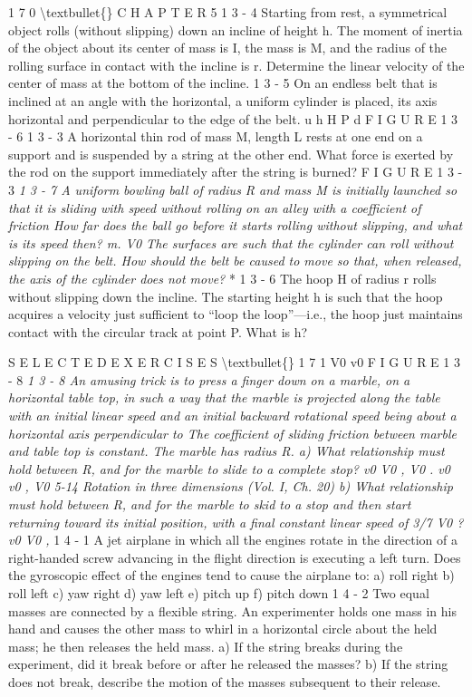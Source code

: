\documentclass[10pt,oneside]{article}
\begin{document}
1 7 0 \textbackslash{}textbullet\{\} C H A P T E R  5 \emph{ } 1 3 - 4 Starting from rest, a symmetrical object rolls (without slipping) down an incline of height h. The moment of inertia of the object about its center of mass is I, the mass is M, and the radius of the rolling surface in contact with the incline is r. Determine the linear velocity of the center of mass at the bottom of the incline. \emph{ } 1 3 - 5 On an endless belt that is inclined at an angle with the horizontal, a uniform cylinder is placed, its axis horizontal and perpendicular to the edge of the belt. u h H P d F I G U R E  1 3 - 6 \emph{ } 1 3 - 3 A horizontal thin rod of mass M, length L rests at one end on a support and is suspended by a string at the other end. What force is exerted by the rod on the support immediately after the string is burned? F I G U R E  1 3 - 3 \emph{ } \emph{ 1 3 - 7 A uniform bowling ball of radius R and mass M is initially launched so that it is sliding with speed without rolling on an alley with a coefficient of friction How far does the ball go before it starts rolling without slipping, and what is its speed then? m. V0 The surfaces are such that the cylinder can roll without slipping on the belt. How should the belt be caused to move so that, when released, the axis of the cylinder does not move? } * 1 3 - 6 The hoop H of radius r rolls without slipping down the incline. The starting height h is such that the hoop acquires a velocity just sufficient to “loop the loop”---i.e., the hoop just maintains contact with the circular track at point P. What is h?\par

S E L E C T E D  E X E R C I S E S \textbackslash{}textbullet\{\} 1 7 1 V0 v0 F I G U R E  1 3 - 8 \emph{ } \emph{ 1 3 - 8 An amusing trick is to press a finger down on a marble, on a horizontal table top, in such a way that the marble is projected along the table with an initial linear speed and an initial backward rotational speed being about a horizontal axis perpendicular to The coefficient of sliding friction between marble and table top is constant. The marble has radius R. a) What relationship must hold between R, and for the marble to slide to a complete stop? v0 V0 , V0 . v0 v0 , V0 5-14 Rotation in three dimensions (Vol. I, Ch. 20) b) What relationship must hold between R, and for the marble to skid to a stop and then start returning toward its initial position, with a final constant linear speed of 3/7 V0 ? v0 V0 , } 1 4 - 1 A jet airplane in which all the engines rotate in the direction of a right-handed screw advancing in the flight direction is executing a left turn. Does the gyroscopic effect of the engines tend to cause the airplane to: a) roll right b) roll left c) yaw right d) yaw left e) pitch up f) pitch down \emph{ } 1 4 - 2 Two equal masses are connected by a flexible string. An experimenter holds one mass in his hand and causes the other mass to whirl in a horizontal circle about the held mass; he then releases the held mass. a) If the string breaks during the experiment, did it break before or after he released the masses? b) If the string does not break, describe the motion of the masses subsequent to their release.\par
\end{document}
